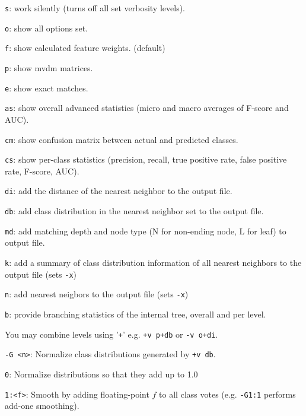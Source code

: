 \documentclass{report}
\begin{document}
\begin{description}
	\begin{description}
         \item {\tt s}:  work silently (turns off all set verbosity levels).
         \item {\tt o}:  show all options set.
         \item {\tt f}:  show calculated feature weights. (default)
         \item {\tt p}:  show {\sc mvdm} matrices.
         \item {\tt e}:  show exact matches.
         \item {\tt as}: show overall advanced statistics (micro and macro averages of F-score and AUC).
	 \item {\tt cm}: show confusion matrix between actual and predicted classes.
         \item {\tt cs}: show per-class statistics (precision, recall, true positive rate, false positive rate, F-score, AUC).
         \item {\tt di}: add the distance of the nearest neighbor to the output file.
         \item {\tt db}: add class distribution in the nearest neighbor set to the output file.
         \item {\tt md}: add matching depth and node type (N for non-ending
           node, L for leaf) to output file.
	 \item {\tt k}:  add a summary of class distribution information of all nearest neighbors to the output file (sets {\tt -x})
         \item {\tt n}:  add nearest neigbors to the output file (sets {\tt -x})
         \item {\tt b}:  provide branching statistics of the internal tree, overall and per level.
	\end{description}

        You may combine levels using '{\tt +}' e.g. {\tt +v p+db} or
        {\tt -v o+di}.

\item {\tt -G <n>}: Normalize class distributions generated by {\tt +v db}.
  \begin{description}
    \item {\tt 0}: Normalize distributions so that they add up to 1.0
    \item {\tt 1:<f>}: Smooth by adding floating-point $f$ to all class votes (e.g. {\tt -G1:1} performs add-one smoothing).
  \end{description}


\end{description}
\end{document}
